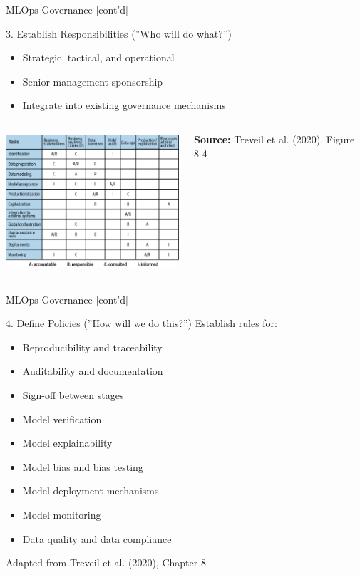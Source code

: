 \documentclass[ignorenonframetext,xcolor=x11names]{beamer}
\begin{document}
\begin{frame}{MLOps Governance \small [cont'd]}
\footnotesize
\begin{block}{3. Establish Responsibilities (''Who will do what?'')}
\begin{itemize}
  \item Strategic, tactical, and operational
  \item Senior management sponsorship
  \item Integrate into existing governance mechanisms
\end{itemize}

\begin{columns}
\begin{column}{.8\textwidth}
\centering
\includegraphics[height=2in]{imlo_0806.png} 
\end{column}
\begin{column}{.2\textwidth}
\tiny \textbf{Source:} Treveil et al. (2020), Figure 8-4
\end{column}
\end{columns}
\end{block}
\end{frame}

\begin{frame}{MLOps Governance \small [cont'd]}
\footnotesize
\begin{block}{4. Define Policies (''How will we do this?'')}
Establish rules for:
\begin{itemize}
   \item Reproducibility and traceability
   \item Auditability and documentation
   \item Sign-off between stages
   \item Model verification
   \item Model explainability
   \item Model bias and bias testing
   \item Model deployment mechanisms
   \item Model monitoring
   \item Data quality and data compliance
\end{itemize}
\end{block}
\tiny Adapted from Treveil et al. (2020), Chapter 8
\end{frame}
\end{document}
